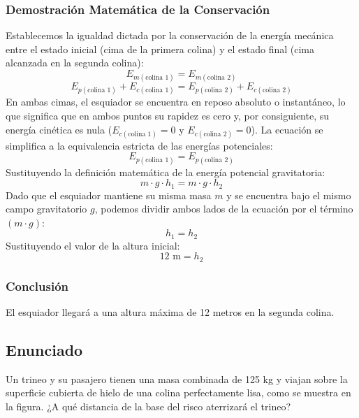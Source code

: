 \documentclass[12pt,a4paper]{article}
\begin{document}
\subsubsection*{Demostración Matemática de la Conservación}
Establecemos la igualdad dictada por la conservación de la energía mecánica entre el estado inicial (cima de la primera colina) y el estado final (cima alcanzada en la segunda colina):
$$E_{m(\text{colina 1})} = E_{m(\text{colina 2})}$$
$$E_{p(\text{colina 1})} + E_{c(\text{colina 1})} = E_{p(\text{colina 2})} + E_{c(\text{colina 2})}$$
En ambas cimas, el esquiador se encuentra en reposo absoluto o instantáneo, lo que significa que en ambos puntos su rapidez es cero y, por consiguiente, su energía cinética es nula ($E_{c(\text{colina 1})} = 0$ y $E_{c(\text{colina 2})} = 0$).
La ecuación se simplifica a la equivalencia estricta de las energías potenciales:
$$E_{p(\text{colina 1})} = E_{p(\text{colina 2})}$$
Sustituyendo la definición matemática de la energía potencial gravitatoria:
$$m \cdot g \cdot h_1 = m \cdot g \cdot h_2$$
Dado que el esquiador mantiene su misma masa $m$ y se encuentra bajo el mismo campo gravitatorio $g$, podemos dividir ambos lados de la ecuación por el término $(m \cdot g)$:
$$h_1 = h_2$$
Sustituyendo el valor de la altura inicial:
$$12 \text{ m} = h_2$$

\subsubsection*{Conclusión}
El esquiador llegará a una altura máxima de 12 metros en la segunda colina.

\newpage
\subsection*{Enunciado}
Un trineo y su pasajero tienen una masa combinada de 125 kg y viajan sobre la superficie cubierta de hielo de una colina perfectamente lisa, como se muestra en la figura. ¿A qué distancia de la base del risco aterrizará el trineo?

\begin{center}
\end{center}
\end{document}
